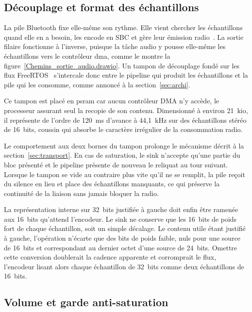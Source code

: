 \subsection{Découplage et format des échantillons}
La pile Bluetooth fixe elle-même son rythme. Elle vient chercher les échantillons quand elle en a besoin, les encode en SBC et gère leur émission radio~\cite{ESP32_IDF_guide}. La sortie filaire fonctionne à l'inverse, puisque la tâche audio y pousse elle-même les échantillons vers le contrôleur \gls{dma}, comme le montre la figure~\ref{Chemins_sortie_audio.drawio}. Un tampon de découplage fondé sur les flux FreeRTOS~\cite{freertos_kernel_doc} s'intercale donc entre le pipeline qui produit les échantillons et la pile qui les consomme, comme annoncé à la section~\ref{sec:archi}.


Ce tampon est placé en \gls{psram} car aucun contrôleur DMA n'y accède, le processeur assurant seul la recopie de son contenu. Dimensionné à environ 21~kio, il représente de l'ordre de 120~ms d'avance à 44,1~kHz sur des échantillons stéréo de 16~bits, coussin qui absorbe le caractère irrégulier de la consommation radio.

Le comportement aux deux bornes du tampon prolonge le mécanisme décrit à la section~\ref{sec:transport}. En cas de saturation, le sink n'accepte qu'une partie du bloc présenté et le pipeline présente de nouveau le reliquat au tour suivant. Lorsque le tampon se vide au contraire plus vite qu'il ne se remplit, la pile reçoit du silence en lieu et place des échantillons manquants, ce qui préserve la continuité de la liaison sans jamais bloquer la radio.

La représentation interne sur 32~bits justifiée à gauche doit enfin être ramenée aux 16~bits qu'attend l'encodeur. Le \gls{sink} ne conserve que les 16~bits de poids fort de chaque échantillon, soit un simple décalage. Le contenu utile étant justifié à gauche, l'opération n'écarte que des bits de poids faible, nuls pour une source de 16~bits et correspondant au dernier octet d'une source de 24~bits. Omettre cette conversion doublerait la cadence apparente et corromprait le flux, l'encodeur lisant alors chaque échantillon de 32~bits comme deux échantillons de 16~bits.

\subsection{Volume et garde anti-saturation}
\label{sec:volume_bt}

